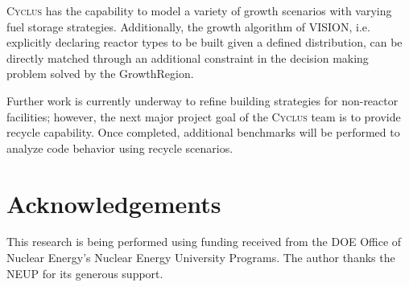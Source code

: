 \documentclass{anstrans}
\begin{document}
\textsc{Cyclus} has the capability to model a variety of growth
scenarios with varying fuel storage strategies.  Additionally, the
growth algorithm of VISION, i.e. explicitly declaring reactor types to
be built given a defined distribution, can be directly matched through
an additional constraint in the decision making problem solved by the
GrowthRegion.

Further work is currently underway to refine building strategies for
non-reactor facilities; however, the next major project goal of the
\textsc{Cyclus} team is to provide recycle capability. Once completed,
additional benchmarks will be performed to analyze code behavior using
recycle scenarios.

\section{Acknowledgements}
This research is being performed using funding received from the DOE
Office of Nuclear Energy's Nuclear Energy University Programs.  The
author thanks the NEUP for its generous support.


\end{document}
